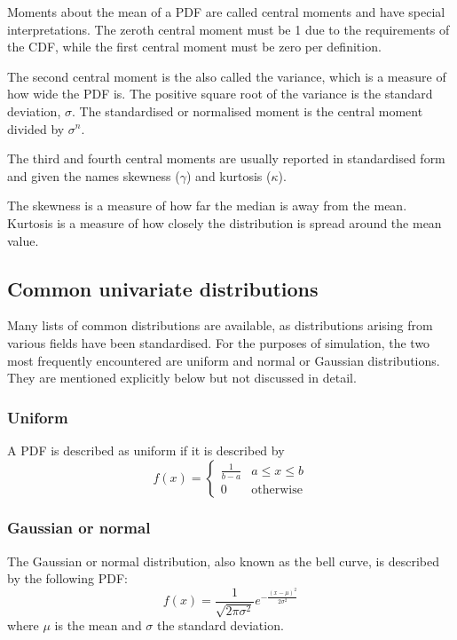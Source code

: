 Moments about the mean of a PDF are called central moments and have special interpretations.  
The zeroth central moment must be 1 due to the requirements of the CDF, while the first central moment must be zero per definition.

The second central moment is the also called the variance, which is a measure of how wide the PDF is.
The positive square root of the variance is the standard deviation, $\sigma$.
The standardised or normalised moment is the central moment divided by $\sigma^n$.

The third and fourth central moments are usually reported in standardised form and given the names skewness ($\gamma$) and kurtosis ($\kappa$).

The skewness is a measure of how far the median is away from the mean.
Kurtosis is a measure of how closely the distribution is spread around the mean value.

\subsection{Common univariate distributions}
Many lists of common distributions are available, as distributions arising from various fields have been standardised.
For the purposes of simulation, the two most frequently encountered are uniform and normal or Gaussian distributions.
They are mentioned explicitly below but not discussed in detail.

\subsubsection{Uniform}
A PDF is described as uniform if it is described by
\begin{equation}
  \label{eq:uniformpdf}
  f(x) =
  \begin{cases}
    \frac{1}{b-a} & a \leq x \leq b \\
    0             & \text{otherwise}
  \end{cases}
\end{equation}

\subsubsection{Gaussian or normal}
The Gaussian or normal distribution, also known as the bell curve, is described by the following PDF:
\begin{equation}
f(x) = \frac{1}{\sqrt{2\pi\sigma^2}} e^{ -\frac{(x-\mu)^2}{2\sigma^2} }
\end{equation}
where $\mu$ is the mean and $\sigma$ the standard deviation.

